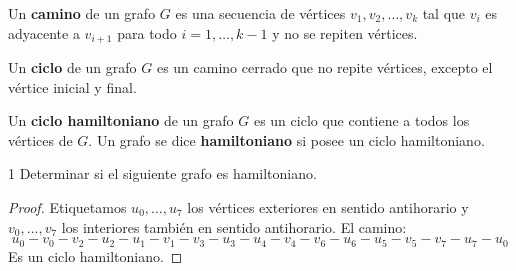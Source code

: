\begin{definition}
    Un \textbf{camino} de un grafo \( G \) es una secuencia de vértices \( v_1, v_2, \dots, v_k \) tal que \( v_i \) es adyacente a \( v_{i+1} \) para todo \( i = 1, \dots, k-1 \) y no se repiten vértices.
\end{definition}

\begin{definition}
    Un \textbf{ciclo} de un grafo \( G \) es un camino cerrado que no repite vértices, excepto el vértice inicial y final.
\end{definition}

\begin{definition}
    Un \textbf{ciclo hamiltoniano} de un grafo \( G \) es un ciclo que contiene a todos los vértices de \( G \). Un grafo se dice \textbf{hamiltoniano} si posee un ciclo hamiltoniano.
\end{definition}

\begin{ejercicio}{1}
    Determinar si el siguiente grafo es hamiltoniano.
\end{ejercicio}

\begin{center}
\end{center}

\begin{proof}
    Etiquetamos \( u_0, \ldots, u_7 \) los vértices exteriores en sentido antihorario y \( v_0, \ldots, v_7 \) los interiores también en sentido antihorario.
    El camino:
    \[ u_0 - v_0 - v_2 - u_2 - u_1 - v_1 - v_3 - u_3 - u_4 - v_4 - v_6 - u_6 - u_5 - v_5 - v_7 - u_7 - u_0 \]
    Es un ciclo hamiltoniano.
\end{proof}

\vspace{0.5cm}

